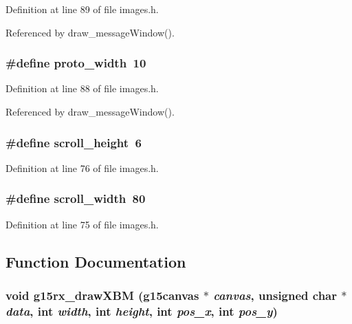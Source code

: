 Definition at line 89 of file images.h.

Referenced by draw\_\-messageWindow().
\subsubsection{\setlength{\rightskip}{0pt plus 5cm}\#define proto\_\-width~10}\label{images_8h_5f30e6adc390684203475a1dcf2732aa}




Definition at line 88 of file images.h.

Referenced by draw\_\-messageWindow().
\subsubsection{\setlength{\rightskip}{0pt plus 5cm}\#define scroll\_\-height~6}\label{images_8h_0e773fb96bae4823d27bee155ee70fc4}




Definition at line 76 of file images.h.
\subsubsection{\setlength{\rightskip}{0pt plus 5cm}\#define scroll\_\-width~80}\label{images_8h_921792459039ced107a16cdc0a648e88}




Definition at line 75 of file images.h.

\subsection{Function Documentation}
\subsubsection{\setlength{\rightskip}{0pt plus 5cm}void g15rx\_\-drawXBM (g15canvas $\ast$ {\em canvas}, unsigned char $\ast$ {\em data}, int {\em width}, int {\em height}, int {\em pos\_\-x}, int {\em pos\_\-y})}\label{images_8h_173db2c48735e9127d4c71243b506808}


